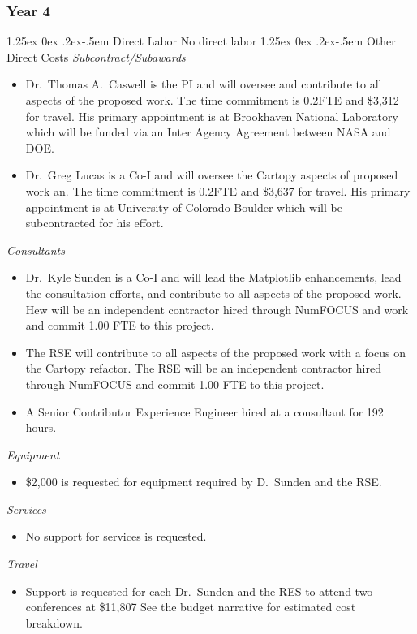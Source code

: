 \documentclass[12pt]{article}
\makeatletter
\numberwithin{page}{section}
\renewcommand{\paragraph}{%
  \@startsection{paragraph}{4}%
  {\z@}{1.25ex \@plus 0ex \@minus .2ex}{-.5em}%
  {\normalfont\normalsize\itshape\bfseries}%
}
\makeatother
\begin{document}
\subsubsection{Year 4}
\paragraph{Direct Labor}
No direct labor
\paragraph{Other Direct Costs}
\textit{Subcontract/Subawards}
\begin{itemize}
  \item Dr.\ Thomas A.\ Caswell is the PI and will oversee and contribute to
    all aspects of the proposed work.  The time commitment is 0.2FTE and \$3,312
    for travel.  His primary appointment is at Brookhaven National Laboratory
    which will be funded via an Inter Agency Agreement between NASA and DOE.
\item Dr.\ Greg Lucas is a Co-I and will oversee the Cartopy aspects of
  proposed work an.  The time commitment is 0.2FTE and \$3,637 for travel.  His
  primary appointment is at University of Colorado Boulder which will be
  subcontracted for his effort.
\end{itemize}
\textit{Consultants}
\begin{itemize}
  \item Dr.\ Kyle Sunden is a Co-I and will lead the Matplotlib enhancements,
    lead the consultation efforts, and contribute to all aspects of the
    proposed work.  Hew will be an independent contractor hired through NumFOCUS and work and commit
    1.00 FTE to this project.
  \item The RSE will contribute to all aspects of the proposed work with a
    focus on the Cartopy refactor.  The RSE will be an independent contractor hired
    through NumFOCUS and commit 1.00 FTE to this project.
  \item A Senior Contributor Experience Engineer hired at a consultant for 192 hours.

\end{itemize}
\textit{Equipment}
\begin{itemize}
\item \$2,000 is requested for equipment required by D.\ Sunden and the RSE.
\end{itemize}
\textit{Services}
\begin{itemize}
\item No support for services is requested.
\end{itemize}
\textit{Travel}
\begin{itemize}
\item Support is requested for each Dr.\ Sunden and the RES to attend two conferences at
  \$11,807  See the budget narrative for estimated cost  breakdown.
\end{itemize}
\end{document}
